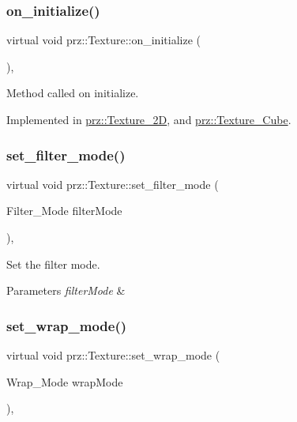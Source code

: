 \subsubsection{\texorpdfstring{on\_initialize()}{on\_initialize()}}
{\footnotesize\ttfamily virtual void prz\+::\+Texture\+::on\+\_\+initialize (\begin{DoxyParamCaption}{ }\end{DoxyParamCaption})\hspace{0.3cm}{\ttfamily [protected]}, {}}



Method called on initialize. 



Implemented in \mbox{\hyperlink{classprz_1_1_texture__2_d_abf56074e463a4811b4e64ccf61931d94}{prz\+::\+Texture\+\_\+2D}}, and \mbox{\hyperlink{classprz_1_1_texture___cube_a428b68f8ceb7476a5780469a40084fab}{prz\+::\+Texture\+\_\+\+Cube}}.

\mbox{\label{classprz_1_1_texture_ad149ad868fd8a2d139b7e69ba7b1936f}} 
\subsubsection{\texorpdfstring{set\_filter\_mode()}{set\_filter\_mode()}}
{\footnotesize\ttfamily virtual void prz\+::\+Texture\+::set\+\_\+filter\+\_\+mode (\begin{DoxyParamCaption}\item[{Filter\+\_\+\+Mode}]{filter\+Mode }\end{DoxyParamCaption})\hspace{0.3cm}{\ttfamily [inline]}, {\ttfamily [virtual]}}



Set the filter mode. 


\begin{DoxyParams}{Parameters}
{\em filter\+Mode} & \\
\hline
\end{DoxyParams}
\mbox{\label{classprz_1_1_texture_afeecdb8009467fd3600c14272f9d887e}} 
\subsubsection{\texorpdfstring{set\_wrap\_mode()}{set\_wrap\_mode()}}
{\footnotesize\ttfamily virtual void prz\+::\+Texture\+::set\+\_\+wrap\+\_\+mode (\begin{DoxyParamCaption}\item[{Wrap\+\_\+\+Mode}]{wrap\+Mode }\end{DoxyParamCaption})\hspace{0.3cm}{\ttfamily [inline]}, {\ttfamily [virtual]}}



